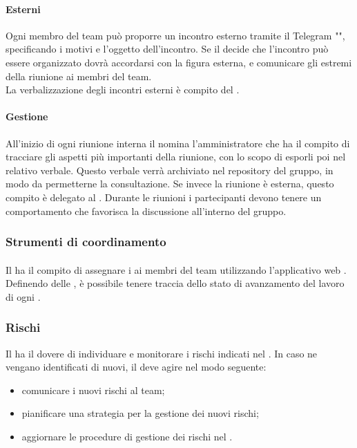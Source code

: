  \paragraph{Esterni} 
 Ogni membro del team può proporre un incontro esterno tramite il  Telegram "", specificando i motivi e l'oggetto dell'incontro. 
Se il \RESP{} decide che l'incontro può essere organizzato dovrà accordarsi con la figura esterna, e comunicare gli estremi della riunione ai membri del team.\\
 La verbalizzazione degli incontri esterni è compito del \RESP.
 \paragraph{Gestione}
 All’inizio di ogni riunione interna il \RESP{} nomina l'amministratore che ha il compito di tracciare gli aspetti più importanti della riunione, con lo scopo di esporli poi nel relativo verbale. Questo verbale verrà archiviato nel repository del gruppo, in modo da permetterne la consultazione. Se invece la riunione è esterna, questo compito è delegato al \RESP{}.
 Durante le riunioni i partecipanti devono tenere un comportamento che favorisca la discussione all’interno del gruppo.
 
\subsubsection{Strumenti di coordinamento}
 \paragraph{}
 Il \RESP{} ha il compito di assegnare i  ai membri del team utilizzando l'applicativo web . \\
 Definendo delle , è possibile tenere traccia dello stato di avanzamento del lavoro di ogni .
 
 \subsubsection{Rischi}
 Il \RESP{} ha il dovere di individuare e monitorare i rischi indicati nel \PPdoc. In caso ne vengano identificati di nuovi, il \RESP{} deve agire nel modo seguente:
 \begin{itemize}
  \item comunicare i nuovi rischi al team;
  \item pianificare una strategia per la gestione dei nuovi rischi;
  \item aggiornare le procedure di gestione dei rischi nel \PPdoc.
 \end{itemize}
